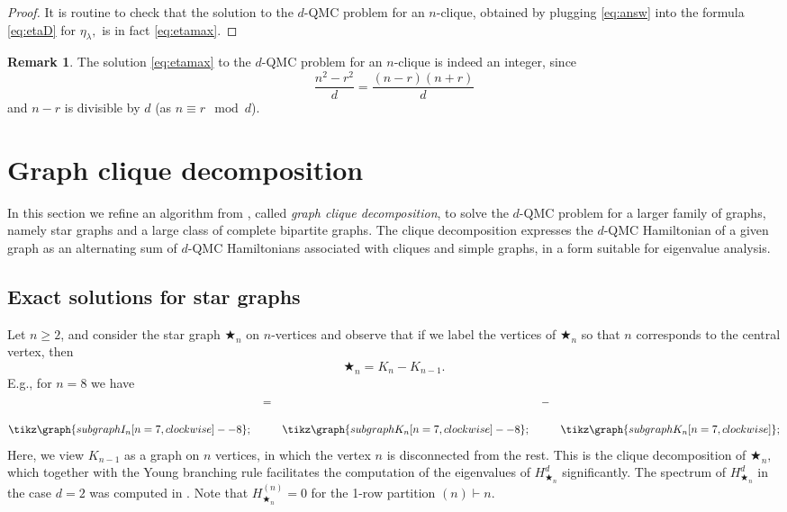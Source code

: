 \documentclass[12pt,dvipsnames,accepted=2016-08-18,a4paper,onecolumn]{quantumarticle}
\def\starn{{\bigstar_{n}}}
\numberwithin{equation}{section}
\theoremstyle{definition}
\newtheorem{remark}[theorem]{Remark}
\begin{document}
\begin{proof}
It is routine to check that the solution to the $d$-QMC problem
for an $n$-clique, obtained by plugging \eqref{eq:answ} into the formula \eqref{eq:etaD} for $\eta_\lambda,$ is in fact \eqref{eq:etamax}.
\end{proof}

\begin{remark}
    The solution \eqref{eq:etamax} to the $d$-QMC problem  for an $n$-clique is indeed an integer, since
    $$
    \frac{n^2-r^2}{d} = \frac{(n-r)(n+r)}{d}
    $$
    and $n-r$ is divisible by $d$ (as $n\equiv r\mod d$).
\end{remark}

\section{Graph clique decomposition}
\label{sec:graph_clique_decomposition}
In this section we refine an algorithm from \cite[Section 6]{BCEHK24}, called \textit{graph clique decomposition}, to solve the $d$-QMC problem for a larger family of graphs, namely star graphs and a large class of complete bipartite graphs. 
The clique decomposition expresses the $d$-QMC Hamiltonian of a given graph as an alternating sum of $d$-QMC Hamiltonians associated with cliques and simple graphs, in a form suitable for eigenvalue analysis.

\subsection{Exact solutions for star graphs}\label{ss:star}
Let $n\ge 2$, and consider the star graph $\starn$ on $n$-vertices and observe that if we label the vertices of $\starn$ so that $n$ corresponds to the central vertex, then
\begin{equation}\label{eq:star}
    \starn = K_n - K_{n-1}.
\end{equation}
E.g., for $n=8$ we have
\[
\tikz 
\graph { subgraph I_n [n=7, clockwise] -- 8};
\quad \raisebox{2.5em}{$=$}  \quad
 \tikz \graph { subgraph K_n [n=7, clockwise] -- 8};
\quad \raisebox{2.5em}{$-$} \quad
 \tikz  \graph { subgraph K_n [n=7, clockwise] };
\]
Here, we view $K_{n-1}$ as a graph on $n$ vertices, in which the vertex $n$ is disconnected from the rest.
This is the clique decomposition of $\starn,$ which together with the Young branching rule \cite[§\,2]{Sag01} facilitates the computation of the eigenvalues of $H_{\starn}^{d}$ significantly. The spectrum of  $H_{\starn}^{d}$ in the case $d=2$ was computed in \cite{BCEHK24}.
Note that $H_\starn^{(n)}=0$ for the 1-row partition $(n)\vdash n$.
\end{document}
